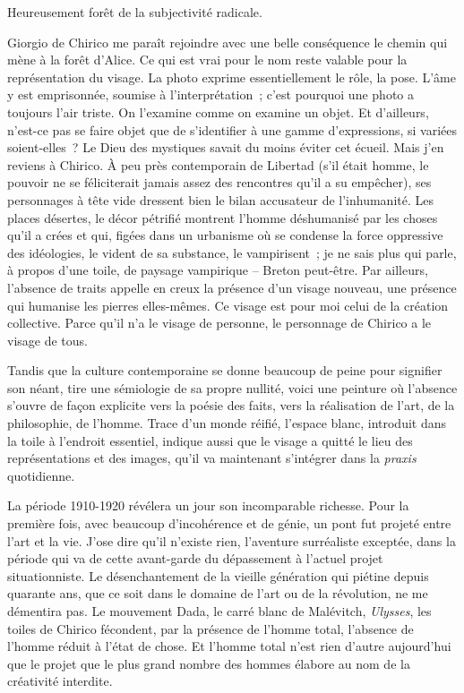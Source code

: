 \documentclass[french,twoside]{book} %
\begin{document}
\noindent Heureusement forêt de la subjectivité radicale.\par
Giorgio de Chirico me paraît rejoindre avec une belle conséquence le chemin qui mène à la forêt d’Alice. Ce qui est vrai pour le nom reste valable pour la représentation du visage. La photo exprime essentiellement le rôle, la pose. L’âme y est emprisonnée, soumise à l’interprétation ; c’est pourquoi une photo a toujours l’air triste. On l’examine comme on examine un objet. Et d’ailleurs, n’est-ce pas se faire objet que de s’identifier à une gamme d’expressions, si variées soient-elles ? Le Dieu des mystiques savait du moins éviter cet écueil. Mais j’en reviens à Chirico. À peu près contemporain de Libertad (s’il était homme, le pouvoir ne se féliciterait jamais assez des rencontres qu’il a su empêcher), ses personnages à tête vide dressent bien le bilan accusateur de l’inhumanité. Les places désertes, le décor pétrifié montrent l’homme déshumanisé par les choses qu’il a crées et qui, figées dans un urbanisme où se condense la force oppressive des idéologies, le vident de sa substance, le vampirisent ; je ne sais plus qui parle, à propos d’une toile, de paysage vampirique – Breton peut-être. Par ailleurs, l’absence de traits appelle en creux la présence d’un visage nouveau, une présence qui humanise les pierres elles-mêmes. Ce visage est pour moi celui de la création collective. Parce qu’il n’a le visage de personne, le personnage de Chirico a le visage de tous.\par
Tandis que la culture contemporaine se donne beaucoup de peine pour signifier son néant, tire une sémiologie de sa propre nullité, voici une peinture où l’absence s’ouvre de façon explicite vers la poésie des faits, vers la réalisation de l’art, de la philosophie, de l’homme. Trace d’un monde réifié, l’espace blanc, introduit dans la toile à l’endroit essentiel, indique aussi que le visage a quitté le lieu des représentations et des images, qu’il va maintenant s’intégrer dans la \emph{praxis} quotidienne.\par
La période 1910-1920 révélera un jour son incomparable richesse. Pour la première fois, avec beaucoup d’incohérence et de génie, un pont fut projeté entre l’art et la vie. J’ose dire qu’il n’existe rien, l’aventure surréaliste exceptée, dans la période qui va de cette avant-garde du dépassement à l’actuel projet situationniste. Le désenchantement de la vieille génération qui piétine depuis quarante ans, que ce soit dans le domaine de l’art ou de la révolution, ne me démentira pas. Le mouvement Dada, le carré blanc de Malévitch, \emph{Ulysses}, les toiles de Chirico fécondent, par la présence de l’homme total, l’absence de l’homme réduit à l’état de chose. Et l’homme total n’est rien d’autre aujourd’hui que le projet que le plus grand nombre des hommes élabore au nom de la créativité interdite.
\end{document}
